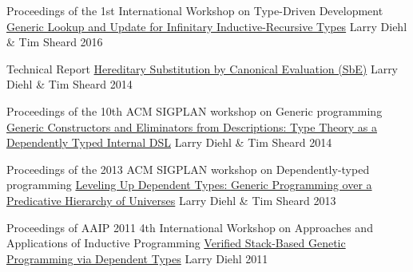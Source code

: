 

\begin{cventries}

  \cventry
    {Proceedings of the 1st International Workshop on Type-Driven Development} %
    {\href{https://github.com/larrytheliquid/infir}{Generic Lookup and Update for Infinitary Inductive-Recursive Types}} %
    {Larry Diehl \& Tim Sheard} %
    {2016} %
    {}

  \cventry
    {Technical Report} %
    {\href{https://github.com/larrytheliquid/sbe}{Hereditary Substitution by Canonical Evaluation (SbE)}} %
    {Larry Diehl \& Tim Sheard} %
    {2014} %
    {}

  \cventry
    {Proceedings of the 10th ACM SIGPLAN workshop on Generic programming} %
    {\href{https://github.com/larrytheliquid/generic-elim}{Generic Constructors and Eliminators from Descriptions: {\tiny Type Theory as a Dependently Typed Internal DSL}}} %
    {Larry Diehl \& Tim Sheard} %
    {2014} %
    {}


  \cventry
    {Proceedings of the 2013 ACM SIGPLAN workshop on Dependently-typed programming} %
    {\href{https://github.com/larrytheliquid/leveling-up}{Leveling Up Dependent Types: {\tiny Generic Programming over a Predicative Hierarchy of Universes}}} %
    {Larry Diehl \& Tim Sheard} %
    {2013} %
    {}

  \cventry
    {Proceedings of AAIP 2011 4th International Workshop on Approaches and Applications of Inductive Programming} %
    {\href{https://github.com/larrytheliquid/aaip11}{Verified Stack-Based Genetic Programming via Dependent Types}} %
    {Larry Diehl} %
    {2011} %
    {}

\end{cventries}
